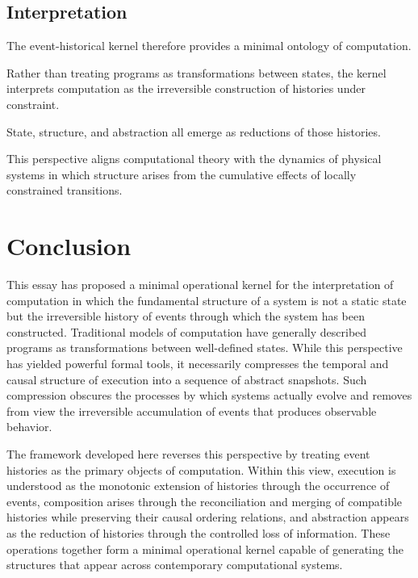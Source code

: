 \documentclass[12pt]{article}
\begin{document}
\subsection{Interpretation}

The event-historical kernel therefore provides
a minimal ontology of computation.

Rather than treating programs as transformations
between states, the kernel interprets computation
as the irreversible construction of histories
under constraint.

State, structure, and abstraction all emerge
as reductions of those histories.

This perspective aligns computational theory
with the dynamics of physical systems in which
structure arises from the cumulative effects
of locally constrained transitions.

\section{Conclusion}

This essay has proposed a minimal operational kernel for the
interpretation of computation in which the fundamental structure
of a system is not a static state but the irreversible history
of events through which the system has been constructed.
Traditional models of computation have generally described
programs as transformations between well-defined states.
While this perspective has yielded powerful formal tools,
it necessarily compresses the temporal and causal structure
of execution into a sequence of abstract snapshots.
Such compression obscures the processes by which systems
actually evolve and removes from view the irreversible
accumulation of events that produces observable behavior.

The framework developed here reverses this perspective by
treating event histories as the primary objects of computation.
Within this view, execution is understood as the monotonic
extension of histories through the occurrence of events,
composition arises through the reconciliation and merging
of compatible histories while preserving their causal
ordering relations, and abstraction appears as the reduction
of histories through the controlled loss of information.
These operations together form a minimal operational kernel
capable of generating the structures that appear across
contemporary computational systems.
\end{document}

